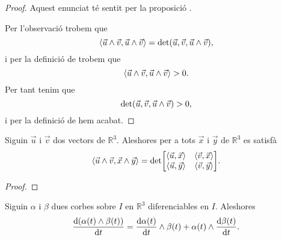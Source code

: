 \documentclass[../Apunts.tex]{subfiles}
\begin{document}
	\begin{proof}
		Aquest enunciat té sentit per la proposició .
		
		Per l'observació  trobem que
		\[\prodesc{\vec{u}\prodvec\vec{v}}{\vec{u}\prodvec\vec{v}}=\det(\vec{u},\vec{v},\vec{u}\prodvec\vec{v}),\]
		i per la definició de  trobem que
		\[\prodesc{\vec{u}\prodvec\vec{v}}{\vec{u}\prodvec\vec{v}}>0.\]
		Per tant tenim que
		\[\det(\vec{u},\vec{v},\vec{u}\mathbin{\wedge}\vec{v})>0,\]
		i per la definició de  hem acabat.
	\end{proof}
	\begin{proposition}
		\label{prop:fórmula de Lagrange}
		Siguin \(\vec{u}\) i \(\vec{v}\) dos vectors de \(\mathbb{R}^{3}\). Aleshores per a tots \(\vec{x}\) i \(\vec{y}\) de \(\mathbb{R}^{3}\) es satisfà
		\[\prodesc{\vec{u}\prodvec\vec{v}}{\vec{x}\prodvec\vec{y}}=\det\left[\begin{matrix}
			\prodesc{\vec{u}}{\vec{x}} & \prodesc{\vec{v}}{\vec{x}} \\
			\prodesc{\vec{u}}{\vec{y}} & \prodesc{\vec{v}}{\vec{y}}
		\end{matrix}\right].\]
	\end{proposition}
	\begin{proof}
	\end{proof}
	\begin{proposition}
		\label{prop:fórmula de Leibniz}
		\label{prop:fórmula per la derivada del producte vectorial de dues corbes}
		Siguin \(\alpha\) i \(\beta\) dues corbes sobre \(I\) en \(\mathbb{R}^{3}\) diferenciables en \(I\). Aleshores
		\[\frac{\mathop{}\!\mathrm{d}(\alpha(t)\mathbin{\wedge}\beta(t))}{\mathop{}\!\mathrm{d} t}=\frac{\mathop{}\!\mathrm{d}\alpha(t)}{\mathop{}\!\mathrm{d} t}\mathbin{\wedge}\beta(t)+\alpha(t)\mathbin{\wedge}\frac{\mathop{}\!\mathrm{d}\beta(t)}{\mathop{}\!\mathrm{d} t}.\]
	\end{proposition}
\end{document}
